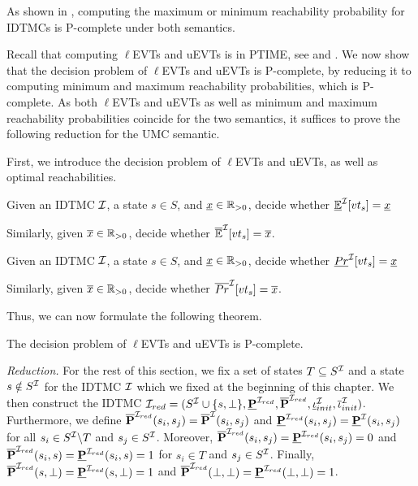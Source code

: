 As shown in \cite{complexity_model_checking_interval-valued_DTMCs}, computing the maximum or minimum reachability probability for IDTMCs is P-complete under both semantics.


Recall that computing $\ell$EVTs and uEVTs is in PTIME, see  and .
We now show that the decision problem of $\ell$EVTs and uEVTs is P-complete, by reducing it to computing minimum and maximum reachability probabilities, which is P-complete. As both $\ell$EVTs and uEVTs as well as minimum and maximum reachability probabilities coincide for the two semantics, it suffices to prove the following reduction for the UMC semantic.

First, we introduce the decision problem of $\ell$EVTs and uEVTs, as well as optimal reachabilities.
\begin{definition}
    Given an IDTMC $\mathcal{I}$, a state $s\in S$, and $\underline{x} \in \mathbb{R}_{> 0}$, decide whether $\mathbb{\underline{E}}^{\mathcal{I}}[vt_s] = \underline{x}$ 
    
    Similarly, given $\overline{x} \in \mathbb{R}_{> 0}$, decide whether $\mathbb{\overline{E}}^{\mathcal{I}}[vt_s] = \overline{x}$.
\end{definition}

\begin{definition}
    Given an IDTMC $\mathcal{I}$, a state $s\in S$, and $\underline{x} \in \mathbb{R}_{> 0}$, decide whether $\underline{Pr}^{\mathcal{I}}[vt_s] = \underline{x}$ 
    
    Similarly, given $\overline{x} \in \mathbb{R}_{> 0}$, decide whether $\overline{Pr}^{\mathcal{I}}[vt_s] = \overline{x}$.
\end{definition}

Thus, we can now formulate the following theorem.
\begin{theorem}\label{th:u/lEVTs_P-complete}
    The decision problem of $\ell$EVTs and uEVTs is P-complete.
\end{theorem}

\emph{Reduction.} For the rest of this section, we fix a set of states $T\subseteq S^{\mathcal{I}}$ and a state $s \notin S^{\mathcal{I}}$ for the IDTMC $\mathcal{I}$ which we fixed at the beginning of this chapter.
We then construct the IDTMC $\mathcal{I}_{red} = (S^{\mathcal{I}} \cup \{s,\bot\}, \mathbf{\underline{P}}^{\mathcal{I}_{red}},\mathbf{\overline{P}}^{\mathcal{I}_{red}},\mathbf{\underline{\iota}}_{init}^{\mathcal{I}},\mathbf{\overline{\iota}}_{init}^{\mathcal{I}})$. Furthermore, we define $\mathbf{\overline{P}}^{\mathcal{I}_{red}}(s_i,s_j) = \mathbf{\overline{P}}^{\mathcal{I}}(s_i,s_j)$ and $\mathbf{\underline{P}}^{\mathcal{I}_{red}}(s_i,s_j) = \mathbf{\underline{P}}^{\mathcal{I}}(s_i,s_j)$ for all $s_i\in S^{\mathcal{I}} \backslash T$ and $s_j\in S^{\mathcal{I}}$. Moreover, $\mathbf{\overline{P}}^{\mathcal{I}_{red}}(s_i,s_j) = \mathbf{\underline{P}}^{\mathcal{I}_{red}}(s_i,s_j) = 0$ and $\mathbf{\overline{P}}^{\mathcal{I}_{red}}(s_i,s) = \mathbf{\underline{P}}^{\mathcal{I}_{red}}(s_i,s) = 1$ for $s_i\in T$ and $s_j\in S^{\mathcal{I}}$. Finally, $\mathbf{\overline{P}}^{\mathcal{I}_{red}}(s,\bot) = \mathbf{\underline{P}}^{\mathcal{I}_{red}}(s,\bot) = 1$ and $\mathbf{\overline{P}}^{\mathcal{I}_{red}}(\bot,\bot) = \mathbf{\underline{P}}^{\mathcal{I}_{red}}(\bot,\bot) = 1$.

